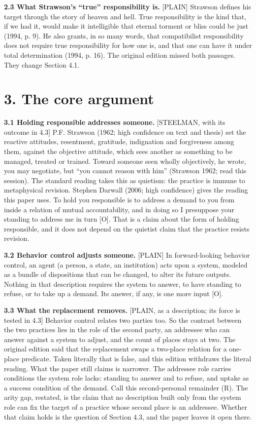 \documentclass[11pt]{article}
\newcommand{\register}[1]{{\ttfamily\small #1}}
\begin{document}
\textbf{2.3 What Strawson's ``true'' responsibility is.} \register{[PLAIN]} Strawson defines his target through the story of heaven and hell. True responsibility is the kind that, if we had it, would make it intelligible that eternal torment or bliss could be just (1994, p. 9). He also grants, in so many words, that compatibilist responsibility does not require true responsibility for how one is, and that one can have it under total determination (1994, p. 16). The original edition missed both passages. They change Section 4.1.

\section*{3. The core argument}

\textbf{3.1 Holding responsible addresses someone.} \register{[STEELMAN, with its outcome in 4.3]} P.F. Strawson (1962; high confidence on text and thesis) set the reactive attitudes, resentment, gratitude, indignation and forgiveness among them, against the objective attitude, which sees another as something to be managed, treated or trained. Toward someone seen wholly objectively, he wrote, you may negotiate, but ``you cannot reason with him'' (Strawson 1962; read this session). The standard reading takes this as quietism: the practice is immune to metaphysical revision. Stephen Darwall (2006; high confidence) gives the reading this paper uses. To hold you responsible is to address a demand to you from inside a relation of mutual accountability, and in doing so I presuppose your standing to address me in turn [O]. That is a claim about the form of holding responsible, and it does not depend on the quietist claim that the practice resists revision.

\textbf{3.2 Behavior control adjusts someone.} \register{[PLAIN]} In forward-looking behavior control, an agent (a person, a state, an institution) acts upon a system, modeled as a bundle of dispositions that can be changed, to alter its future outputs. Nothing in that description requires the system to answer, to have standing to refuse, or to take up a demand. Its answer, if any, is one more input [O].

\textbf{3.3 What the replacement removes.} \register{[PLAIN, as a description; its force is tested in 4.3]} Behavior control relates two parties too. So the contrast between the two practices lies in the role of the second party, an addressee who can answer against a system to adjust, and the count of places stays at two. The original edition said that the replacement swaps a two-place relation for a one-place predicate. Taken literally that is false, and this edition withdraws the literal reading. What the paper still claims is narrower. The addressee role carries conditions the system role lacks: standing to answer and to refuse, and uptake as a success condition of the demand. Call this second-personal remainder (R). The arity gap, restated, is the claim that no description built only from the system role can fix the target of a practice whose second place is an addressee. Whether that claim holds is the question of Section 4.3, and the paper leaves it open there.
\end{document}
